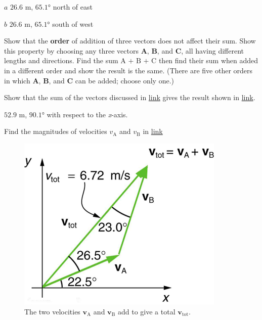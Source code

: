 \documentclass[
]{book}
\begin{document}
\leavevmode{}%
\(a\) \({\text{26}\text{.}\text{6\ m}}{}\),
\({\text{65}\text{.}\text{1°}}{}\) north of east

\(b\) \({\text{26}\text{.}\text{6\ m}}{}\),
\({\text{65}\text{.}\text{1°}}{}\) south of west

\hypertarget{fs-id1165296576869}{}
\leavevmode{}%
Show that the \textbf{order} of addition of three vectors does not affect
their sum. Show this property by choosing any three vectors
\(\mathbf{A}{}\), \(\mathbf{B}{}\), and \(\mathbf{C}{}\), all having different
lengths and directions. Find the sum \(\text{A~+~B~+~C}{}\) then find
their sum when added in a different order and show the result is the
same. (There are five other orders in which \(\mathbf{A}{}\),
\(\mathbf{B}{}\), and \(\mathbf{C}{}\) can be added; choose only one.)

\hypertarget{fs-id1165298800490}{}
\leavevmode{}%
Show that the sum of the vectors discussed in
\protect\hyperlink{fs-id1165296679497}{link} gives the result
shown in \protect\hyperlink{import-auto-id1165296298190}{link}.

\leavevmode{}%
\({\text{52}\text{.}\text{9\ m}}{}\), \({\text{90}\text{.}\text{1°}}{}\)
with respect to the \emph{x}-axis.

\hypertarget{fs-id1165298704732}{}
\leavevmode{}%
Find the magnitudes of velocities \(v_{\text{A}}{}\) and \(v_{\text{B}}{}\)
in \protect\hyperlink{import-auto-id1165296217666}{link}

\begin{figure}
\hypertarget{import-auto-id1165296217666}{%
\centering
\includegraphics{images/Figure_03_02_23a.jpg}
\caption{The two velocities \(\textbf{v}_{\text{A}}{}\) and
\(\textbf{v}_{\text{B}}{}\) add to give a total
\(\textbf{v}_{\text{tot}}{}\).}\label{import-auto-id1165296217666}
}
\end{figure}
\end{document}
